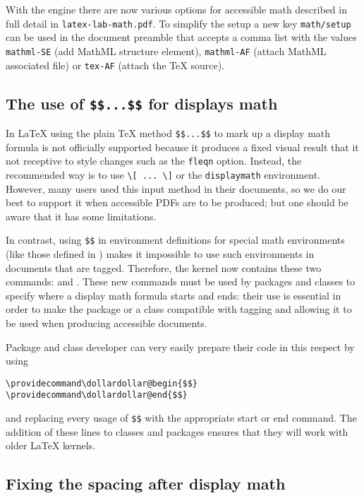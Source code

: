 \documentclass{ltnews}
\providecommand\env[1]{\texttt{#1}}
\providecommand\LuaTeX{\hologo{LuaTeX}}
\providecommand\env[1]{\texttt{#1}}
\begin{document}
With the \LuaTeX{} engine there are now various options for accessible
math described in full detail in \texttt{latex-lab-math.pdf}. To
simplify the setup a new key \texttt{math/setup} can be used in the
document preamble that accepts a comma list with the values
\texttt{mathml-SE} (add MathML structure element), \texttt{mathml-AF}
(attach MathML associated file) or \texttt{tex-AF} (attach the \TeX{}
source).


\subsection{The use of \texttt{\$\$...\$\$} for displays math}

In \LaTeX{} using the plain \TeX{} method \verb=$$...$$= to mark up a
display math formula is not officially supported because it produces a
fixed visual result that it not receptive to style changes such as the
\texttt{fleqn} option. Instead, the recommended way is to use
\verb=\[ ... \]= or the \env{displaymath} environment. However, many
users used this input method in their documents, so we do our best to
support it when accessible PDFs are to be produced; but one should be
aware that it has some limitations.

In contrast, using \verb=$$= in environment definitions for special
math environments (like those defined in ) makes it
impossible to use such environments in documents that are tagged.
Therefore, the kernel now contains these two commands:
 and .  These new commands
must be used by packages and classes to specify where a display math
formula starts and ends: their use is essential in order to make the
package or a class compatible with tagging and allowing it to be used
when producing accessible documents.

Package and class developer can very easily prepare their code in this
respect by using
\begin{verbatim}
\providecommand\dollardollar@begin{$$}
\providecommand\dollardollar@end{$$}
\end{verbatim}
and replacing every usage of \verb=$$= with the appropriate start or
end command.  The addition of these  lines to
classes and packages ensures that they will work with older \LaTeX{}
kernels.



\subsection{Fixing the spacing after display math}
\end{document}
